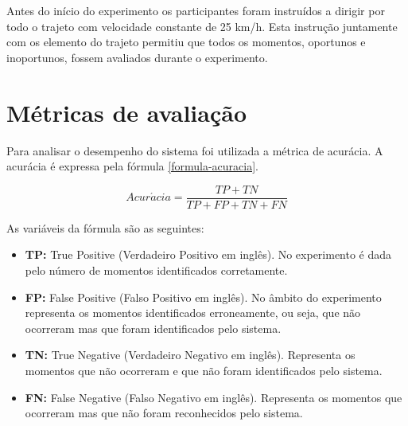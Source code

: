 Antes do início do experimento os participantes foram instruídos a dirigir por todo o trajeto com
velocidade constante de 25 km/h. Esta instrução juntamente com os elemento do trajeto permitiu que todos
os momentos, oportunos e inoportunos, fossem avaliados durante o experimento.

\section{Métricas de avaliação}
\label{metricas}

Para analisar o desempenho do sistema foi utilizada a métrica de acurácia. A acurácia é expressa pela
fórmula \ref{formula-acuracia}.

\begin{equation}
  Acur\acute{a}cia = \frac{TP + TN}{TP + FP + TN + FN}
\label{formula-acuracia}
\end{equation}

As variáveis da fórmula são as seguintes:

\begin{itemize}
  \item \textbf{TP:} True Positive (Verdadeiro Positivo em inglês). No experimento é dada pelo número de
  momentos identificados corretamente.
  \item \textbf{FP:} False Positive (Falso Positivo em inglês). No âmbito do experimento representa os
  momentos identificados erroneamente, ou seja, que não ocorreram mas que foram identificados pelo sistema.
  \item \textbf{TN:} True Negative (Verdadeiro Negativo em inglês). Representa os momentos que não ocorreram
  e que não foram identificados pelo sistema.
  \item \textbf{FN:} False Negative (Falso Negativo em inglês). Representa os momentos que ocorreram mas
  que não foram reconhecidos pelo sistema.
\end{itemize}
